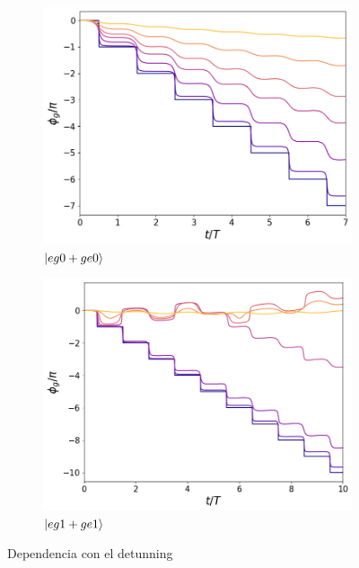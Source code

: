 \begin{figure}[h]
    \centering
    \begin{subfigure}{0.49\textwidth}
        \includegraphics[width=\textwidth]{figuras/ch5/dependencia/eg0+/detunning todo 0.png}
        \caption{$\ket{eg0+ge0}$}
        \label{fig5:dependencia detunning eg0}
    \end{subfigure}
    \hfill
    \begin{subfigure}{0.49\textwidth}
        \includegraphics[width=\textwidth]{figuras/ch5/dependencia/eg1+/detunning todo 0.png}
        \caption{$\ket{eg1+ge1}$}
        \label{fig5:dependencia detunning eg1}
    \end{subfigure}
    \caption{Dependencia con el detunning}
    \label{fig5:dependencia detunning}
\end{figure}
